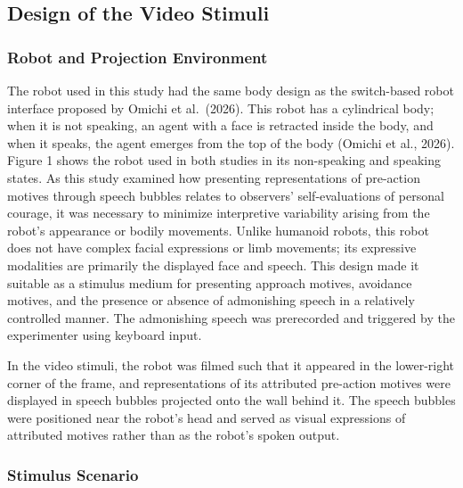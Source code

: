 \documentclass[
]{article}
\begin{document}
\subsection{Design of the Video
Stimuli}\label{design-of-the-video-stimuli}

\subsubsection{Robot and Projection
Environment}\label{robot-and-projection-environment}

The robot used in this study had the same body design as the
switch-based robot interface proposed by Omichi et al.~(2026). This
robot has a cylindrical body; when it is not speaking, an agent with a
face is retracted inside the body, and when it speaks, the agent emerges
from the top of the body (Omichi et al., 2026). Figure 1 shows the robot
used in both studies in its non-speaking and speaking states. As this
study examined how presenting representations of pre-action motives
through speech bubbles relates to observers' self-evaluations of
personal courage, it was necessary to minimize interpretive variability
arising from the robot's appearance or bodily movements. Unlike humanoid
robots, this robot does not have complex facial expressions or limb
movements; its expressive modalities are primarily the displayed face
and speech. This design made it suitable as a stimulus medium for
presenting approach motives, avoidance motives, and the presence or
absence of admonishing speech in a relatively controlled manner. The
admonishing speech was prerecorded and triggered by the experimenter
using keyboard input.

In the video stimuli, the robot was filmed such that it appeared in the
lower-right corner of the frame, and representations of its attributed
pre-action motives were displayed in speech bubbles projected onto the
wall behind it. The speech bubbles were positioned near the robot's head
and served as visual expressions of attributed motives rather than as
the robot's spoken output.

\subsubsection{Stimulus Scenario}\label{stimulus-scenario}
\end{document}
